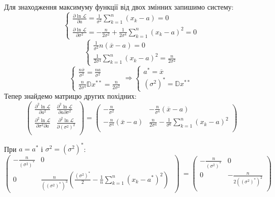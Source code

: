 \documentclass[14pt, a4paper, ukrainian]{extreport}
\begin{document}
	Для знаходження максимуму функції від двох змінних запишимо систему:
	$$
	\begin{cases}
		\frac{\partial \ln \mathcal{L}}{\partial a}  = \frac{1}{\sigma^2}\sum_{k = 1}^{n}(x_k - a) = 0 \\
		\frac{\partial \ln \mathcal{L}}{\partial \sigma^2} = -\frac{n}{2\sigma^2} + \frac{1}{2\sigma^4}\sum_{k = 1}^{n}(x_k - a)^2 = 0
	\end{cases} 
	$$
	$$
	\begin{cases}
		\frac{1}{\sigma^2}n(\overline{x} - a) = 0 \\
		\frac{1}{2\sigma^4}\sum_{k = 1}^{n}(x_k - a)^2 = \frac{n}{2\sigma^2}
	\end{cases} 
	$$
	$$
	\begin{cases}
		\frac{n\overline{x}}{\sigma^2} = \frac{na}{\sigma^2} \\
		\frac{n}{2\sigma^4}\mathbb{D}x^{**} = \frac{n}{2\sigma^2}
	\end{cases} \Rightarrow
	\begin{cases}
		a^* = \overline{x} \\
		(\sigma^2)^* = \mathbb{D}x^{**}
	\end{cases} 
	$$
	Тепер знайдемо матрицю других похідних:
	$$ \left( \begin{matrix}
		\frac{\partial^2 \ln \mathcal{L}}{\partial a^2} & \frac{\partial^2 \ln \mathcal{L}}{\partial a \partial \sigma^2} \\
		\frac{\partial^2 \ln \mathcal{L}}{\partial \sigma^2 \partial a} & \frac{\partial^2 \ln \mathcal{L}}{\partial (\sigma^2)^2} \\
	\end{matrix} \right) = 
	\left( \begin{matrix}
		-\frac{n}{\sigma^2} &  -\frac{n}{\sigma^4}(\overline x - a)\\
		-\frac{n}{\sigma^4}(\overline x - a) & \frac{n}{2\sigma^4} - \frac{1}{\sigma^6}\sum_{k = 1}^{n}(x_k - a)^2\\
	\end{matrix} \right)
	$$
	
	При $a = a^*$ і $\sigma^2 = (\sigma^2)^*$:
	$$ \left( \begin{matrix}
		-\frac{n}{(\sigma^2)^*} & 0 \\
		0 & \frac{n}{((\sigma^2)^*)^3} \left(\frac{(\sigma^2)^*}{2}- \frac{1}{n}\sum_{k = 1}^{n}(x_k - a^*)^2 \right)\
	\end{matrix} \right)\ = 
	\left( \begin{matrix}
		-\frac{n}{(\sigma^2)^*} & 0 \\
		0 & -\frac{n}{2((\sigma^2)^*)^2} \\
	\end{matrix} \right)\
	$$
	
\end{document}
